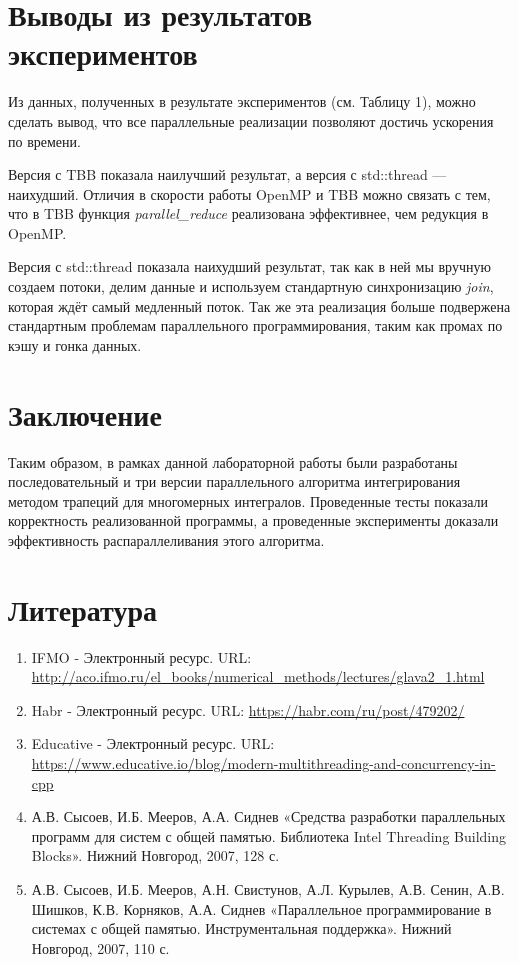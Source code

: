 \documentclass{report}
\begin{document}
\section*{Выводы из результатов экспериментов}
\par Из данных, полученных в результате экспериментов (см. Таблицу 1), можно сделать вывод, что все параллельные реализации позволяют достичь ускорения по времени.
\par Версия с TBB показала наилучший результат, а версия с std::thread --- наихудший. Отличия в скорости работы OpenMP и TBB можно связать с тем, что в TBB функция \emph{parallel\_reduce} реализована эффективнее, чем редукция в OpenMP.
\par Версия с std::thread показала наихудший результат, так как в ней мы вручную создаем потоки, делим данные и используем стандартную синхронизацию \emph{join}, которая ждёт самый медленный поток. Так же эта реализация больше подвержена стандартным проблемам параллельного программирования, таким как промах по кэшу и гонка данных.
\newpage

\section*{Заключение}
Таким образом, в рамках данной лабораторной работы были разработаны последовательный и три версии параллельного алгоритма интегрирования методом трапеций для многомерных интегралов. Проведенные тесты показали корректность реализованной программы, а проведенные эксперименты доказали эффективность распараллеливания этого алгоритма.
\newpage

\section*{Литература}
\begin{enumerate}
\item IFMO - Электронный ресурс. URL: \newline \url{http://aco.ifmo.ru/el_books/numerical_methods/lectures/glava2_1.html}
\item Habr - Электронный ресурс. URL: \newline \url{https://habr.com/ru/post/479202/}
\item Educative - Электронный ресурс. URL: \newline \url{https://www.educative.io/blog/modern-multithreading-and-concurrency-in-cpp}
\item А.В. Сысоев, И.Б. Мееров, А.А. Сиднев «Средства разработки параллельных программ для систем с общей памятью. Библиотека Intel Threading Building Blocks». Нижний Новгород, 2007, 128 с. 
\item А.В. Сысоев, И.Б. Мееров, А.Н. Свистунов, А.Л. Курылев, А.В. Сенин, А.В. Шишков, К.В. Корняков, А.А. Сиднев «Параллельное программирование в системах с общей
памятью. Инструментальная поддержка». Нижний Новгород, 2007, 110 с. 
\end{enumerate}
\end{document}
